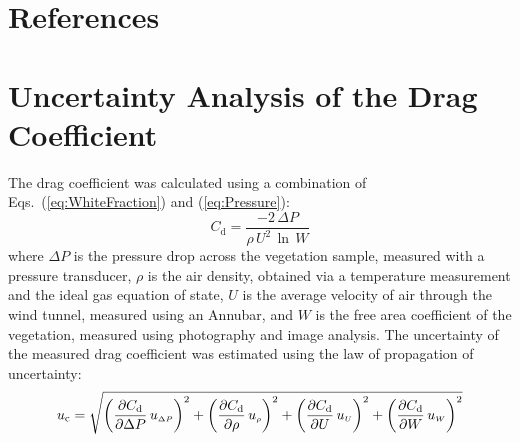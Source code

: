\documentclass[12pt]{article}
\begin{document}
\section*{References}


\pagebreak


\appendix
{}
\makeatletter
\newcommand{\section@cntformat}{Appendix:\ }
\makeatother
\section{Uncertainty Analysis of the Drag Coefficient} \label{sec:UncertaintyDrag}

The drag coefficient was calculated using a combination of Eqs.~(\ref{eq:WhiteFraction}) and (\ref{eq:Pressure}):
\begin{equation}\label{eq:drag_coefficient}
  C_\mathrm{d} = \frac{-2 \, \Delta P}{\rho \, U^2 \, \ln \, W}
\end{equation}
where $\Delta P$ is the pressure drop across the vegetation sample, measured with a pressure transducer, $\rho$ is the air density, obtained via a temperature measurement and the ideal gas equation of state, $U$ is the average velocity of air through the wind tunnel, measured using an Annubar, and $W$ is the free area coefficient of the vegetation, measured using photography and image analysis. The uncertainty of the measured drag coefficient was estimated using the law of propagation of uncertainty:
\begin{equation}
\label{eq:DragUncertainty}
u_\mathrm{c} = \sqrt{{\left( \frac{\partial C_{\rm d}}{\partial \Delta P}\,u_{\scriptscriptstyle \Delta P} \right)}^2+{\left(\frac{\partial C_{\rm d}}{\partial \rho}\,u_{\scriptscriptstyle \rho}\right)}^2+{\left(\frac{\partial C_{\rm d}}{\partial U}\,u_{\scriptscriptstyle U}\right)}^2+{\left(\frac{\partial C_{\rm d}}{\partial W}\,u_{\scriptscriptstyle W}\right)}^2}
\end{equation}
\end{document}
